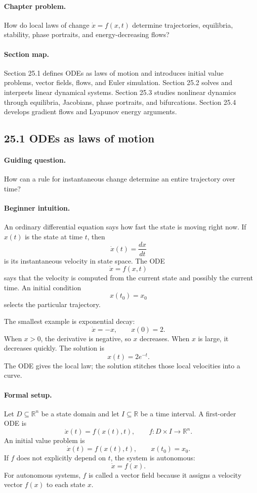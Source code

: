 \paragraph{Chapter problem.}
How do local laws of change \(\dot x=f(x,t)\) determine trajectories, equilibria, stability, phase portraits, and energy-decreasing flows?

\paragraph{Section map.}
Section 25.1 defines ODEs as laws of motion and introduces initial value problems, vector fields, flows, and Euler simulation. Section 25.2 solves and interprets linear dynamical systems. Section 25.3 studies nonlinear dynamics through equilibria, Jacobians, phase portraits, and bifurcations. Section 25.4 develops gradient flows and Lyapunov energy arguments.

\subsection{25.1 ODEs as laws of motion}

\paragraph{Guiding question.}
How can a rule for instantaneous change determine an entire trajectory over time?

\paragraph{Beginner intuition.}
An ordinary differential equation says how fast the state is moving right now. If \(x(t)\) is the state at time \(t\), then
\[
\dot x(t)=\frac{dx}{dt}
\]
is its instantaneous velocity in state space. The ODE
\[
\dot x=f(x,t)
\]
says that the velocity is computed from the current state and possibly the current time. An initial condition
\[
x(t_0)=x_0
\]
selects the particular trajectory.

The smallest example is exponential decay:
\[
\dot x=-x,\qquad x(0)=2.
\]
When \(x>0\), the derivative is negative, so \(x\) decreases. When \(x\) is large, it decreases quickly. The solution is
\[
x(t)=2e^{-t}.
\]
The ODE gives the local law; the solution stitches those local velocities into a curve.

\paragraph{Formal setup.}
Let \(D\subseteq\mathbb{R}^n\) be a state domain and let \(I\subseteq\mathbb{R}\) be a time interval. A first-order ODE is
\[
\dot x(t)=f(x(t),t),
\qquad
f:D\times I\to\mathbb{R}^n.
\]
An initial value problem is
\[
\dot x(t)=f(x(t),t),\qquad x(t_0)=x_0.
\]
If \(f\) does not explicitly depend on \(t\), the system is autonomous:
\[
\dot x=f(x).
\]
For autonomous systems, \(f\) is called a vector field because it assigns a velocity vector \(f(x)\) to each state \(x\).

